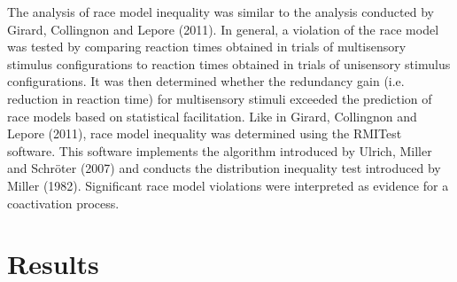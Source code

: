\documentclass[12pt]{article}
\begin{document}
\par The analysis of race model inequality was similar to the analysis conducted by Girard, Collingnon and Lepore (2011). In general, a violation of the race model was tested by comparing reaction times obtained in trials of multisensory stimulus configurations to reaction times obtained in trials of unisensory stimulus configurations. It was then determined whether the redundancy gain (i.e. reduction in reaction time) for multisensory stimuli exceeded the prediction of race models based on statistical facilitation. Like in Girard, Collingnon and Lepore (2011), race model inequality was determined using the RMITest software. This software implements the algorithm introduced by Ulrich, Miller and Schröter (2007) and conducts the distribution inequality test introduced by Miller (1982). Significant race model violations were interpreted as evidence for a coactivation process.
\section{Results}
\end{document}
